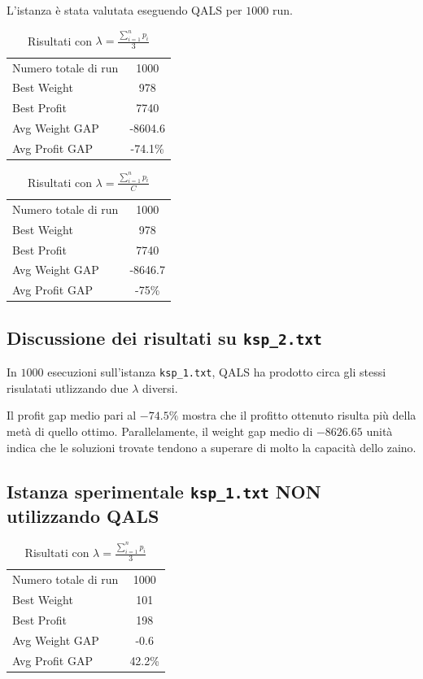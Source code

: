\documentclass[a4paper,12pt]{article}
\begin{document}
L'istanza è stata valutata eseguendo QALS per \(1000\) run.
\begin{table}[h!]
\centering
\begin{tabular}{lc}
\toprule
Numero totale di run & 1000 \\
Best Weight & 978 \\
Best Profit & 7740 \\
Avg Weight GAP & -8604.6 \\
Avg Profit GAP & -74.1\% \\
\bottomrule
\end{tabular}
\caption{Risultati con $\lambda = \displaystyle \frac{\sum_{i=1}^{n} p_i}{3}$}
\end{table}

\begin{table}[h!]
\centering
\begin{tabular}{lc}
\toprule
Numero totale di run & 1000 \\
Best Weight & 978 \\
Best Profit & 7740 \\
Avg Weight GAP & -8646.7 \\
Avg Profit GAP & -75\% \\
\bottomrule
\end{tabular}
\caption{Risultati con $\lambda = \displaystyle \frac{\sum_{i=1}^{n} p_i}{C}$}
\end{table}

\subsection*{Discussione dei risultati su \texttt{ksp\_2.txt}}
In \(1000\) esecuzioni sull'istanza \texttt{ksp\_1.txt}, QALS ha prodotto circa 
gli stessi risulatati utlizzando due $\lambda$ diversi.

Il profit gap medio pari al \(-74.5\%\) mostra che 
il profitto ottenuto risulta più della metà di quello ottimo. Parallelamente, 
il weight gap medio di \(-8626.65\) unità indica che le soluzioni trovate tendono a 
superare di molto la capacità dello zaino.

\subsection*{Istanza sperimentale \texttt{ksp\_1.txt} NON utilizzando QALS}
\begin{table}[h!]
\centering
\begin{tabular}{lc}
\toprule
Numero totale di run & 1000 \\
Best Weight & 101 \\
Best Profit & 198 \\
Avg Weight GAP & -0.6 \\
Avg Profit GAP & 42.2\% \\
\bottomrule
\end{tabular}
\caption{Risultati con $\lambda = \displaystyle \frac{\sum_{i=1}^{n} p_i}{3}$}
\end{table}
\end{document}
